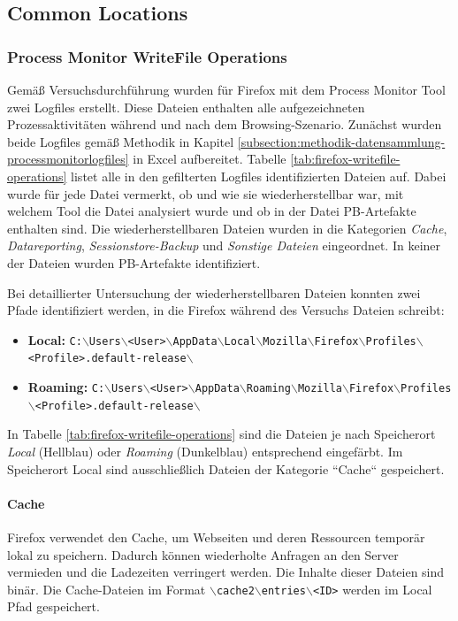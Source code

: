 \begin{appendices}
\subsection{Common Locations}
\label{subsection:appendix-firefox-common-locations}
\subsubsection*{Process Monitor WriteFile Operations}
\label{subsubsection:appendix-firefox-common-locations-writefile-operations}
Gemäß Versuchsdurchführung wurden für Firefox mit dem Process Monitor Tool zwei Logfiles erstellt. Diese Dateien enthalten alle aufgezeichneten Prozessaktivitäten während und nach dem Browsing-Szenario.
Zunächst wurden beide Logfiles gemäß Methodik in Kapitel \ref{subsection:methodik-datensammlung-processmonitorlogfiles} in Excel aufbereitet. Tabelle \ref{tab:firefox-writefile-operations} listet alle in den gefilterten Logfiles identifizierten Dateien auf. Dabei wurde für jede Datei vermerkt, ob und wie sie wiederherstellbar war, mit welchem Tool die Datei analysiert wurde und ob in der Datei PB-Artefakte enthalten sind. Die wiederherstellbaren Dateien wurden in die Kategorien \textit{Cache}, \textit{Datareporting}, \textit{Sessionstore-Backup} und \textit{Sonstige Dateien} eingeordnet. In keiner der Dateien wurden PB-Artefakte identifiziert.

Bei detaillierter Untersuchung der wiederherstellbaren Dateien konnten zwei Pfade identifiziert werden, in die Firefox während des Versuchs Dateien schreibt: 
\begin{itemize}
\item \textbf{Local:} \texttt{C:$\backslash$Users$\backslash$<User>$\backslash$AppData$\backslash$Local$\backslash$Mozilla$\backslash$Firefox$\backslash$Profiles$\backslash$<Profile>.default-release$\backslash$}
\item \textbf{Roaming:} \texttt{C:$\backslash$Users$\backslash$<User>$\backslash$AppData$\backslash$Roaming$\backslash$Mozilla$\backslash$Firefox$\backslash$Profiles$\backslash$<Profile>.default-release$\backslash$}
\end{itemize}
In Tabelle 	\ref{tab:firefox-writefile-operations} sind die Dateien je nach Speicherort \textit{Local} (Hellblau) oder \textit{Roaming} (Dunkelblau) entsprechend eingefärbt. Im Speicherort Local sind ausschließlich Dateien der Kategorie ``Cache`` gespeichert.

\paragraph*{Cache}
Firefox verwendet den Cache, um Webseiten und deren Ressourcen temporär lokal zu speichern. Dadurch können wiederholte Anfragen an den Server vermieden und die Ladezeiten verringert werden. Die Inhalte dieser Dateien sind binär.
Die Cache-Dateien im Format \texttt{$\backslash$cache2$\backslash$entries$\backslash$<ID>} werden im Local Pfad gespeichert.


\end{appendices}
